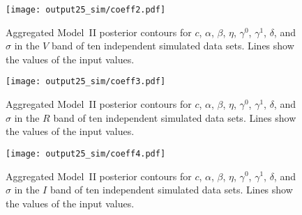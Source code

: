 \documentclass{aastex61}   	%
\begin{document}
\begin{figure}[htbp] %
   \centering
   \texttt{[image: output25\_sim/coeff2.pdf]} 
            \caption{Aggregated Model~II posterior contours for $c$, $\alpha$, $\beta$, $\eta$, $\gamma^0$, $\gamma^1$,  $\delta$, and $\sigma$ in the $V$ band of ten independent simulated data sets.   Lines show the values of the input values.
 \label{simglobal3:fig}}
\end{figure}

\begin{figure}[htbp] %
   \centering
      \texttt{[image: output25\_sim/coeff3.pdf]} 
            \caption{Aggregated Model~II posterior contours for $c$, $\alpha$, $\beta$, $\eta$, $\gamma^0$, $\gamma^1$,  $\delta$, and $\sigma$ in the $R$ band of ten independent simulated data sets.   Lines show the values of the input values.
\label{simglobal4:fig}}
\end{figure}

\begin{figure}[htbp] %
   \centering
         \texttt{[image: output25\_sim/coeff4.pdf]} 
            \caption{Aggregated Model~II posterior contours for $c$, $\alpha$, $\beta$, $\eta$, $\gamma^0$, $\gamma^1$,  $\delta$, and $\sigma$ in the $I$ band of ten independent simulated data sets.   Lines show the values of the input values.
 \label{simglobal5:fig}}
\end{figure}
\end{document}
